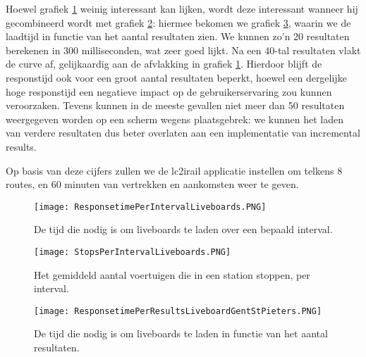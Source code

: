 Hoewel grafiek  \ref{fig:responsetimeperintervalliveboards} weinig interessant kan lijken, wordt deze interessant wanneer hij gecombineerd wordt met grafiek \ref{fig:stopsperintervalliveboards}: hiermee bekomen we grafiek \ref{fig:responsetimeperresultsliveboards}, waarin we de laadtijd in functie van het aantal resultaten zien. We kunnen zo'n 20 resultaten berekenen in 300 milliseconden, wat zeer goed lijkt. Na een 40-tal resultaten vlakt de curve af, gelijkaardig aan de afvlakking in grafiek \ref{fig:responsetimeperintervalliveboards}. Hierdoor blijft de responstijd ook voor een groot aantal resultaten beperkt, hoewel een dergelijke hoge responstijd een negatieve impact op de gebruikerservaring zou kunnen veroorzaken. Tevens kunnen in de meeste gevallen niet meer dan 50 resultaten weergegeven worden op een scherm wegens plaatsgebrek: we kunnen het laden van verdere resultaten dus beter overlaten aan een implementatie van incremental results.

Op basis van deze cijfers zullen we de lc2irail applicatie instellen om telkens 8 routes, en 60 minuten van vertrekken en aankomsten weer te geven.

\begin{figure}
	\centering
	\texttt{[image: ResponsetimePerIntervalLiveboards.PNG]}
	\caption[Laadtijd liveboards in functie van het overlopen interval]{De tijd die nodig is om liveboards te laden over een bepaald interval.}
	\label{fig:responsetimeperintervalliveboards}
\end{figure}

\begin{figure}
	\centering
	\texttt{[image: StopsPerIntervalLiveboards.PNG]}
	\caption[Het gemiddeld aantal voertuigen die stoppen per interval in een station]{Het gemiddeld aantal voertuigen die in een station stoppen, per interval.}
	\label{fig:stopsperintervalliveboards}
\end{figure}

\begin{figure}
	\centering
	\texttt{[image: ResponsetimePerResultsLiveboardGentStPieters.PNG]}
	\caption[Laadtijd liveboards in functie van het aantal resultaten]{De tijd die nodig is om liveboards te laden in functie van het aantal resultaten.}
	\label{fig:responsetimeperresultsliveboards}
\end{figure}

